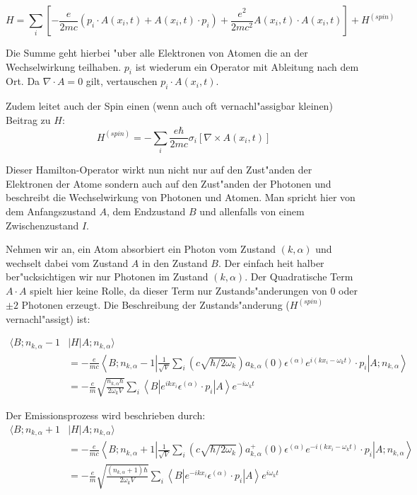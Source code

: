 \begin{equation}
H = \sum_i \left[ -\frac{e}{2mc}(p_i \cdot A(x_i, t) + A(x_i, t) \cdot p_i) + \frac{e^2}{2mc^2}A(x_i, t) \cdot A(x_i, t)\right] + H^{(spin)}
\end{equation}

Die Summe geht hierbei "uber alle Elektronen von Atomen die an der Wechselwirkung teilhaben. $p_i$ ist wiederum ein Operator mit Ableitung nach dem Ort. Da $\nabla \cdot A = 0$ gilt, vertauschen $p_i \cdot A(x_i, t)$.

Zudem leitet auch der Spin einen (wenn auch oft vernachl"assigbar kleinen) Beitrag zu $H$:
\begin{equation}
H^{(spin)} = - \sum_i \frac{e \hbar}{2mc}\sigma_i \left[\nabla \times A(x_i, t)\right]
\end{equation}

Dieser Hamilton-Operator wirkt nun nicht nur auf den Zust"anden der Elektronen der Atome sondern auch auf den Zust"anden der Photonen und beschreibt die Wechselwirkung von Photonen und Atomen. Man spricht hier von dem Anfangszustand $A$, dem Endzustand $B$ und allenfalls von einem Zwischenzustand $I$.

Nehmen wir an, ein Atom absorbiert ein Photon vom Zustand $(k,\alpha)$ und wechselt dabei vom Zustand $A$ in den Zustand $B$. Der einfach heit halber ber"ucksichtigen wir nur Photonen im Zustand $(k,\alpha)$. Der Quadratische Term $A \cdot A$ spielt hier keine Rolle, da dieser Term nur Zustands"anderungen von $0$ oder $\pm 2$ Photonen erzeugt. Die Beschreibung der Zustands"anderung ($H^{(spin)}$ vernachl"assigt) ist:

\begin{equation}
\begin{split}
\langle B; n_{k,\alpha} - 1 &| H | A; n_{k,\alpha} \rangle \\
&= -\frac{e}{mc} \left\langle B; n_{k,\alpha} - 1 \left| 
\frac{1}{\sqrt{V}} \sum_i \left(c \sqrt{\hbar/2 \omega_k}\right)a_{k,\alpha}(0) \epsilon^{(\alpha)} e^{i(kx_i-\omega_k t)} \cdot p_i 
\right| A; n_{k,\alpha} \right\rangle\\
&= -\frac{e}{m} \sqrt{\frac{n_{k,\alpha} \hbar}{2 \omega_k V}} \sum_i \left\langle B \left| 
e^{ikx_i} \epsilon^{(\alpha)} \cdot p_i 
\right| A \right\rangle e^{-i\omega_k t}
\end{split}
\end{equation}

Der Emissionsprozess wird beschrieben durch:
\begin{equation}
\begin{split}
\langle B; n_{k,\alpha} + 1 &| H | A; n_{k,\alpha} \rangle \\
&= -\frac{e}{mc} \left\langle B; n_{k,\alpha} + 1 \left| 
\frac{1}{\sqrt{V}} \sum_i \left(c \sqrt{\hbar/2 \omega_k}\right)a^+_{k,\alpha}(0) \epsilon^{(\alpha)} e^{-i(kx_i-\omega_k t)} \cdot p_i 
\right| A; n_{k,\alpha} \right\rangle\\
&= -\frac{e}{m} \sqrt{\frac{ (n_{k,\alpha}+1) \hbar}{2 \omega_k V}} \sum_i \left\langle B \left| 
e^{-ikx_i} \epsilon^{(\alpha)} \cdot p_i 
\right| A \right\rangle e^{i\omega_k t}
\end{split}
\end{equation}

